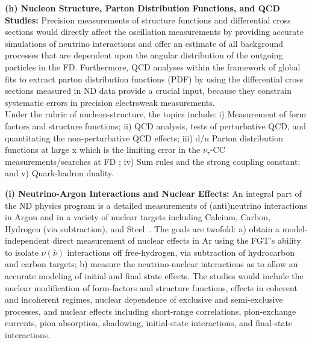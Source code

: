 \vspace{0.25cm} 
\noindent 
{\bf (h) Nucleon Structure, Parton Distribution Functions, and QCD Studies:} 
Precision measurements of  structure functions and 
differential cross sections would directly affect the oscillation measurements 
by providing accurate simulations of neutrino interactions and offer an estimate of 
all background processes that are dependent upon the angular distribution of 
the outgoing particles in the FD. 
Furthermore, QCD analyses within the framework of global fits to 
extract parton distribution functions (PDF) by using the differential cross sections 
measured in ND data provide a crucial input,  because they  constrain systematic errors in 
precision electroweak measurements.\\
Under the rubric of nucleon-structure, the topics include: i) Measurement of form factors and structure functions; ii) QCD analysis,  tests of perturbative QCD,  and quantitating the non-perturbative 
QCD effects; iii) d/u Parton distribution functions at large x which is the limiting error in the 
$\nu_\tau$-CC measurements/searches at FD ; iv) Sum rules and the strong coupling constant; and v) Quark-hadron duality. 
%
%
%

\vspace{0.25cm} 
\noindent 
{\bf (i) Neutrino-Argon Interactions and Nuclear Effects:} 
An integral part of the ND physics program is a  detailed measurements of (anti)neutrino 
interactions in Argon and in a variety of nuclear targets including Calcium, Carbon, Hydrogen (via subtraction), 
and Steel~\cite{ND-NUCL}. 
The goals are twofold: a) obtain a model-independent direct measurement of nuclear effects in Ar 
using the FGT's ability to isolate $\nu (\bar \nu)$ interactions off free-hydrogen, 
via subtraction of hydrocarbon and carbon targets; 
b) measure the neutrino-nuclear interactions as to allow an accurate modeling 
of initial and final state effects. The studies would include 
the nuclear modification of form-factors and structure functions, effects in coherent and incoherent 
regimes, nuclear dependence of exclusive and semi-exclusive processes, and nuclear 
effects including short-range correlations, pion-exchange currents, pion absorption, shadowing, 
initial-state interactions, and final-state interactions. 

